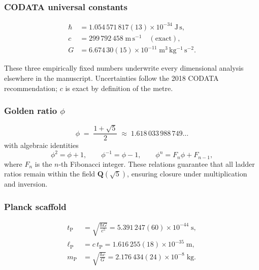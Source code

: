 \documentclass[11pt,oneside]{book}
\begin{document}
\subsubsection{CODATA universal constants}
\label{subsubsec:codata-constants}

\begin{align*}
\hbar &= 1.054\,571\,817(13)\times10^{-34}\;\mathrm{J\,s},\\
c     &= 299\,792\,458\;\mathrm{m\,s^{-1}}\quad(\text{exact}),\\
G     &= 6.674\,30(15)\times10^{-11}\;\mathrm{m^{3}\,kg^{-1}\,s^{-2}}.
\end{align*}

These three empirically fixed numbers underwrite every dimensional analysis
elsewhere in the manuscript.  Uncertainties follow the 2018 CODATA
recommendation; $c$ is exact by definition of the metre.

\subsubsection{Golden ratio \texorpdfstring{$\phi$}{phi}}
\label{subsubsec:golden-ratio}

\[
  \phi \;=\; \frac{1+\sqrt{5}}{2}
        \;\approx\; 1.618\,033\,988\,749\dots
\]
with algebraic identities
\[
  \phi^{2} = \phi + 1,
  \qquad
  \phi^{-1} = \phi - 1,
  \qquad
  \phi^{n} = F_{n}\phi + F_{n-1},
\]
where $F_{n}$ is the $n$-th Fibonacci integer.  These relations guarantee that
all ladder ratios remain within the field $\mathbf{Q}(\sqrt{5})$, ensuring
closure under multiplication and inversion.

\subsubsection{Planck scaffold}
\label{subsubsec:planck-scaffold}

\begin{align*}
t_{\text{P}} &= \sqrt{\frac{\hbar G}{c^{5}}}
              = 5.391\,247(60)\times10^{-44}\;\mathrm{s},\\[4pt]
\ell_{\text{P}} &= c\,t_{\text{P}}
                = 1.616\,255(18)\times10^{-35}\;\mathrm{m},\\[4pt]
m_{\text{P}} &= \sqrt{\frac{\hbar c}{G}}
              = 2.176\,434(24)\times10^{-8}\;\mathrm{kg}.
\end{align*}
\end{document}
